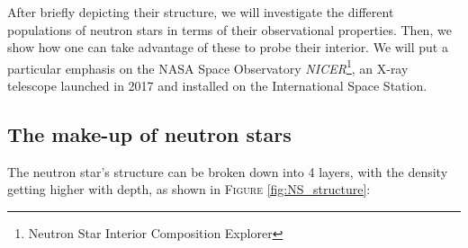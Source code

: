 \documentclass[a4paper, twoside, 12pt]{article}
\numberwithin{equation}{section}
\begin{document}
\hspace{\parindent}	 After briefly depicting their structure, we will investigate the different populations of neutron stars in terms of their observational properties. Then, we show how one can take advantage of these to probe their interior. We will put a particular emphasis on the NASA Space Observatory {\itshape{NICER}}\footnote{Neutron Star Interior Composition Explorer}\cite{NICER_mission}, an X-ray telescope launched in 2017 and installed on the International Space Station. 

\subsection{The make-up of neutron stars}

\hspace{\parindent}	 The neutron star's structure can be broken down into 4 layers, with the density getting higher with depth, as shown in F\textsc{igure} \ref{fig:NS_structure}: \\
\end{document}
